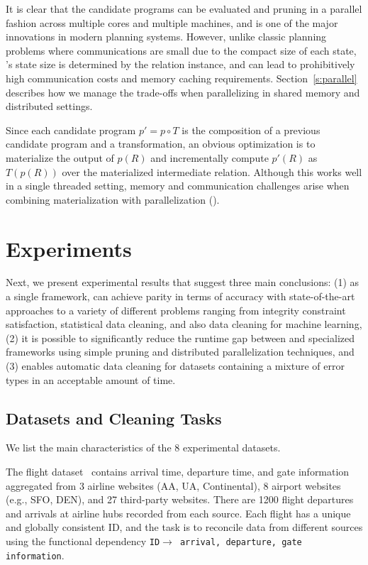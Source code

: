  It is clear that the candidate programs can be evaluated and pruning in a parallel fashion across multiple cores and multiple machines, and is one of the major innovations in modern planning systems.  However, unlike classic planning problems where communications are small due to the compact size of each state, \sys's state size is determined by the relation instance, and can lead to prohibitively high communication costs and memory caching requirements.   Section~\ref{s:parallel} describes how we manage the trade-offs when parallelizing \sys in shared memory and distributed settings.

 Since each candidate program $p' = p\circ T$ is the composition of a previous candidate program and a transformation, an obvious optimization is to materialize the output of $p(R)$ and incrementally compute $p'(R)$ as $T(p(R))$ over the materialized intermediate relation.  Although this works well in a single threaded setting, memory and communication challenges arise when combining materialization with parallelization ().



\section{Experiments}\label{s:exp}
Next, we present experimental results that suggest three main conclusions: (1) as a single framework, \sys can achieve parity in terms of accuracy with state-of-the-art approaches to a variety of different problems ranging from integrity constraint satisfaction, statistical data cleaning, and also data cleaning for machine learning, (2) it is possible to significantly reduce the runtime gap between \sys and specialized frameworks using simple pruning and distributed parallelization techniques, and (3) \sys enables automatic data cleaning for datasets containing a mixture of error types in an acceptable amount of time.  

\subsection*{Datasets and Cleaning Tasks}
We list the main characteristics of the 8 experimental datasets.

 The flight dataset~\cite{data-flights} contains arrival time, departure time, and gate information aggregated from 3 airline websites (AA, UA, Continental), 8 airport websites (e.g., SFO, DEN), and 27 third-party websites.
There are 1200 flight departures and arrivals at airline hubs recorded from each source.  Each flight has a unique and globally consistent ID, and the task is to reconcile data from different sources using the functional dependency \texttt{ID$\rightarrow$ arrival, departure, gate information}.

